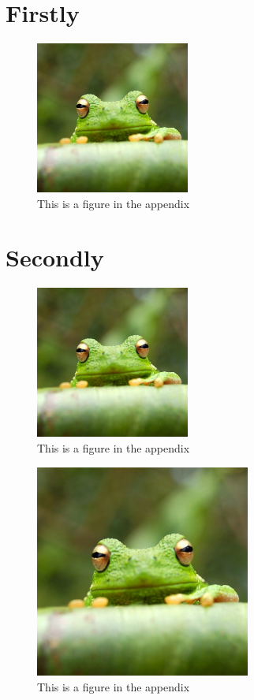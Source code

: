 \documentclass[9pt,bestpractices]{livecoms}
\begin{document}
\nocite{*} %



\appendix

\section{Firstly}\label{first:app}
\lipsum[1]

\begin{figure}[bt!]
\centering
\includegraphics[width=\linewidth,height=5cm]{frog}
\caption{This is a figure in the appendix}
\label{fig:app}
\end{figure}

\section{Secondly}

\lipsum[5-8]

\begin{figure}[hbt!]
\centering
\includegraphics[width=\linewidth,height=5cm]{frog}
\caption{This is a figure in the appendix}
\end{figure}

\begin{figure}[hbt!]
\centering
\includegraphics[width=\linewidth,height=7cm]{frog}
\caption{This is a figure in the appendix}
\end{figure}
\end{document}
